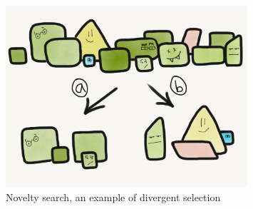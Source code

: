 \begin{figure}
  \includegraphics[width=0.8\textwidth]{img/novelty_search}
  \captionsetup{singlelinecheck=off,justification=raggedright}
  \caption{Novelty search, an example of divergent selection \cite{Wilder2015ReconcilingEvolvability}}
\end{figure}